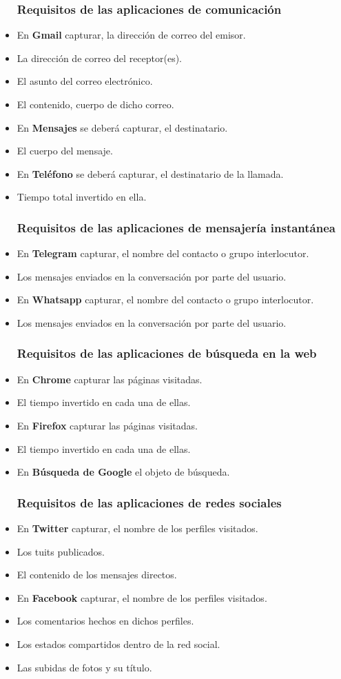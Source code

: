 \documentclass[12pt,a4paper,oneside]{book} %
\begin{document}
\begin{itemize}
\subsubsection{Requisitos de las aplicaciones de comunicación}
  \item En  \textbf{Gmail} capturar, la dirección de correo del emisor. 
  \item La dirección de correo del receptor(es). 
  \item El asunto del correo electrónico. 
  \item El contenido, cuerpo de dicho correo. 
  \item En \textbf{Mensajes} se deberá capturar, el destinatario. 
  \item El cuerpo del mensaje. 
  \item En \textbf{Teléfono} se deberá capturar, el destinatario de la llamada. 
  \item Tiempo total invertido en ella. 
\subsubsection{Requisitos de las aplicaciones de mensajería instantánea}
  \item En \textbf{Telegram} capturar, el nombre del contacto o grupo interlocutor. 
  \item Los mensajes enviados en la conversación por parte del usuario. 
  \item En \textbf{Whatsapp} capturar, el nombre del contacto o grupo interlocutor. 
  \item Los mensajes enviados en la conversación por parte del usuario. 
\subsubsection{Requisitos de las aplicaciones de búsqueda en la web}
  \item En \textbf{Chrome} capturar las páginas visitadas. 
  \item El tiempo invertido en cada una de ellas. 
  \item En \textbf{Firefox} capturar las páginas visitadas. 
  \item El tiempo invertido en cada una de ellas. 
  \item En \textbf{Búsqueda de Google} el objeto de búsqueda. 
\subsubsection{Requisitos de las aplicaciones de redes sociales}
  \item En \textbf{Twitter} capturar, el nombre de los perfiles visitados. 
  \item Los tuits publicados. 
  \item El contenido de los mensajes directos. 
  \item En \textbf{Facebook} capturar, el nombre de los perfiles visitados. 
  \item Los comentarios hechos en dichos perfiles. 
  \item Los estados compartidos dentro de la red social. 
  \item Las subidas de fotos y su título. 
\end{itemize}
\end{document}
